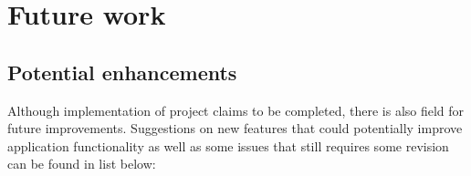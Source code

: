 %


\section{Future work}
\label{sec:ch8_future_work}
 
\subsection{Potential enhancements}
 
Although implementation of project claims to be completed, there is also field for future improvements. Suggestions on new features that could potentially improve application functionality as well as some issues that still requires some revision can be found in list below:

